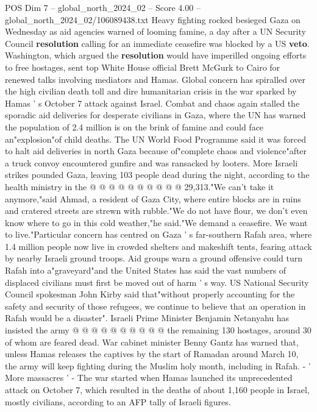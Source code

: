 \begin{textsample}{POS Dim 7 – global\_north\_2024\_02 – Score 4.00 – global\_north\_2024\_02/106089438.txt}  \label{ex:f7_pos_160}
Heavy fighting rocked besieged Gaza on Wednesday as aid agencies warned of looming famine, a day after a UN Security Council \textbf{resolution} calling for an immediate ceasefire was blocked by a US \textbf{veto}.
Washington, which argued the \textbf{resolution} would have imperilled ongoing efforts to free hostages, sent top White House official Brett McGurk to Cairo for renewed talks involving mediators and Hamas.
Global concern has spiralled over the high civilian death toll and dire humanitarian crisis in the war sparked by Hamas ' s October 7 attack against Israel.
Combat and chaos again stalled the sporadic aid deliveries for desperate civilians in Gaza, where the UN has warned the population of 2.4 million is on the brink of famine and could face an"explosion"of child deaths.
The UN World Food Programme said it was forced to halt aid deliveries in north Gaza because of"complete chaos and violence"after a truck convoy encountered gunfire and was ransacked by looters.
More Israeli strikes pounded Gaza, leaving 103 people dead during the night, according to the health ministry in the @ @ @ @ @ @ @ @ @ @ 29,313."We can't take it anymore,"said Ahmad, a resident of Gaza City, where entire blocks are in ruins and cratered streets are strewn with rubble."We do not have flour, we don't even know where to go in this cold weather,"he said."We demand a ceasefire.
We want to live."Particular concern has centred on Gaza ' s far-southern Rafah area, where 1.4 million people now live in crowded shelters and makeshift tents, fearing attack by nearby Israeli ground troops.
Aid groups warn a ground offensive could turn Rafah into a"graveyard"and the United States has said the vast numbers of displaced civilians must first be moved out of harm ' s way.
US National Security Council spokesman John Kirby said that"without properly accounting for the safety and security of those refugees, we continue to believe that an operation in Rafah would be a disaster".
Israeli Prime Minister Benjamin Netanyahu has insisted the army @ @ @ @ @ @ @ @ @ @ the remaining 130 hostages, around 30 of whom are feared dead.
War cabinet minister Benny Gantz has warned that, unless Hamas releases the captives by the start of Ramadan around March 10, the army will keep fighting during the Muslim holy month, including in Rafah. - ' More massacres ' - The war started when Hamas launched its unprecedented attack on October 7, which resulted in the deaths of about 1,160 people in Israel, mostly civilians, according to an AFP tally of Israeli figures.

\end{textsample}
